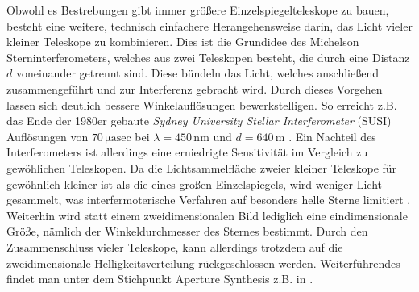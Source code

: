 Obwohl es Bestrebungen gibt immer größere Einzelspiegelteleskope zu bauen, besteht eine weitere, technisch einfachere Herangehensweise darin, das Licht vieler kleiner Teleskope zu kombinieren. 
Dies ist die Grundidee des Michelson Sterninterferometers, welches aus zwei Teleskopen besteht, die durch eine Distanz $d$ voneinander getrennt sind. 
Diese bündeln das Licht, welches anschließend zusammengeführt und zur Interferenz gebracht wird. 
Durch dieses Vorgehen lassen sich deutlich bessere Winkelauflösungen bewerkstelligen. 
So erreicht z.B. das Ende der 1980er gebaute \emph{Sydney University Stellar Interferometer} (SUSI) Auflösungen von $70\,\mathrm{\mu asec}$ bei $\lambda=450\,\mathrm{nm}$ und $d=640\,\mathrm{m}$ \cite{davisSydneyUniversityStellar1999}. 
Ein Nachteil des Interferometers ist allerdings eine erniedrigte Sensitivität im Vergleich zu gewöhlichen Teleskopen. 
Da die Lichtsammelfläche zweier kleiner Teleskope für gewöhnlich kleiner ist als die eines großen Einzelspiegels, wird weniger Licht gesammelt, was interfermoterische Verfahren auf besonders helle Sterne limitiert \cite{foxQuantumOpticsIntroduction2006}. 
Weiterhin wird statt einem zweidimensionalen Bild lediglich eine eindimensionale Größe, nämlich der Winkeldurchmesser des Sternes bestimmt. 
Durch den Zusammenschluss vieler Teleskope, kann allerdings trotzdem auf die zweidimensionale Helligkeitsverteilung rückgeschlossen werden. 
Weiterführendes findet man unter dem  Stichpunkt \glqq Aperture Synthesis \grqq z.B. in \cite[Kap. 10]{burkeIntroductionRadioAstronomy2019}. \\

